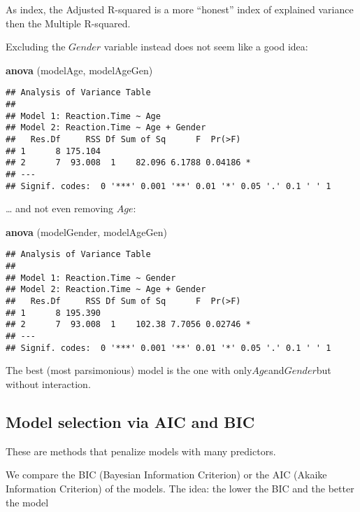 \documentclass[
]{article}
\newenvironment{Shaded}{\begin{snugshade}}{\end{snugshade}}
\newcommand{\KeywordTok}[1]{\textcolor[rgb]{0.13,0.29,0.53}{\textbf{#1}}}
\newcommand{\NormalTok}[1]{#1}
\begin{document}
As index, the Adjusted R-squared is a more ``honest'' index of explained
variance then the Multiple R-squared.

Excluding the \(Gender\) variable instead does not seem like a good
idea:

\begin{Shaded}
\begin{Highlighting}[]
\KeywordTok{anova}\NormalTok{ (modelAge, modelAgeGen)}
\end{Highlighting}
\end{Shaded}

\begin{verbatim}
## Analysis of Variance Table
## 
## Model 1: Reaction.Time ~ Age
## Model 2: Reaction.Time ~ Age + Gender
##   Res.Df     RSS Df Sum of Sq      F  Pr(>F)  
## 1      8 175.104                              
## 2      7  93.008  1    82.096 6.1788 0.04186 *
## ---
## Signif. codes:  0 '***' 0.001 '**' 0.01 '*' 0.05 '.' 0.1 ' ' 1
\end{verbatim}

\ldots{} and not even removing \(Age\):

\begin{Shaded}
\begin{Highlighting}[]
\KeywordTok{anova}\NormalTok{ (modelGender, modelAgeGen)}
\end{Highlighting}
\end{Shaded}

\begin{verbatim}
## Analysis of Variance Table
## 
## Model 1: Reaction.Time ~ Gender
## Model 2: Reaction.Time ~ Age + Gender
##   Res.Df     RSS Df Sum of Sq      F  Pr(>F)  
## 1      8 195.390                              
## 2      7  93.008  1    102.38 7.7056 0.02746 *
## ---
## Signif. codes:  0 '***' 0.001 '**' 0.01 '*' 0.05 '.' 0.1 ' ' 1
\end{verbatim}

The best (most parsimonious) model is the one with
only\(Age\)and\(Gender\)but without interaction.

\hypertarget{model-selection-via-aic-and-bic}{%
\subsection{Model selection via AIC and
BIC}\label{model-selection-via-aic-and-bic}}

These are methods that penalize models with many predictors.

We compare the BIC (Bayesian Information Criterion) or the AIC (Akaike
Information Criterion) of the models. The idea: the lower the BIC and
the better the model
\end{document}
